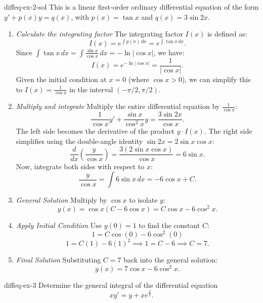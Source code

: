\documentclass[preview]{standalone}
\begin{document}
\begin{snippetsolution}{diffeq-ex-2-sol}{}
    This is a linear first-order ordinary differential equation of the form \(y' + p(x)y = q(x)\), with \(p(x) = \tan x\) and \(q(x) = 3 \sin 2x\).

    \begin{enumerate}
        \item \emph{Calculate the integrating factor}
        The integrating factor \(I(x)\) is defined as:
        \[ I(x) = e^{\int p(x) \, dx} = e^{\int \tan x \, dx}. \]
        Since \(\int \tan x \, dx = \int \frac{\sin x}{\cos x} \, dx = -\ln|\cos x|\), we have:
        \[ I(x) = e^{-\ln|\cos x|} = \frac{1}{|\cos x|}. \]
        Given the initial condition at \(x=0\) (where \(\cos x > 0\)), we can simplify this to \(I(x) = \frac{1}{\cos x}\) in the interval \((-\pi/2, \pi/2)\). 
        \item \emph{Multiply and integrate}
        Multiply the entire differential equation by \(\frac{1}{\cos x}\):
        \[ \frac{1}{\cos x}y' + \frac{\sin x}{\cos^2 x}y = \frac{3 \sin 2x}{\cos x}. \]
        The left side becomes the derivative of the product \(y \cdot I(x)\). The right side simplifies using the double-angle identity \(\sin 2x = 2 \sin x \cos x\):
        \[ \frac{d}{dx}\left( \frac{y}{\cos x} \right) = \frac{3(2 \sin x \cos x)}{\cos x} = 6 \sin x. \]
        Now, integrate both sides with respect to \(x\):
        \[ \frac{y}{\cos x} = \int 6 \sin x \, dx = -6 \cos x + C. \]
        \item \emph{General Solution}
        Multiply by \(\cos x\) to isolate \(y\):
        \[ y(x) = \cos x (C - 6 \cos x) = C \cos x - 6 \cos^2 x. \]
        \item \emph{Apply Initial Condition}
        Use \(y(0) = 1\) to find the constant \(C\):
        \[ 1 = C \cos(0) - 6 \cos^2(0) \]
        \[ 1 = C(1) - 6(1)^2 \implies 1 = C - 6 \implies C = 7. \]
        \item \emph{Final Solution}
        Substituting \(C=7\) back into the general solution:
        \[ y(x) = 7 \cos x - 6 \cos^2 x. \]
    \end{enumerate}
\end{snippetsolution}

\begin{snippetexercise}{diffeq-ex-3}{}
    Determine the general integral of the differential equation
    \[ xy' = y + xe^{\frac{y}{x}}. \]
\end{snippetexercise}
\end{document}
